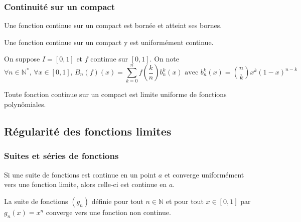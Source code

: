 	\subsubsection{Continuité sur un compact}
	
	
	\begin{proposition}
		Une fonction continue sur un compact est bornée et atteint ses bornes.
	\end{proposition}
	
	\begin{theorem}[Heine]
		Une fonction continue sur un compact y est uniformément continue.
	\end{theorem}
	
	
	\begin{theorem}[Bernstein]
		On suppose $I = [0,1]$ et $f$ continue sur $[0,1]$. On note
		\[ \forall n \in \mathbb{N}^*, \, \forall x \in [0,1], \, B_n(f)(x) = \sum_{k=0}^n f \left(\frac{k}{n}\right) b_n^k(x) \text{ avec } b_n^k(x) = \binom{n}{k} x^k (1-x)^{n-k} \]
	\end{theorem}
	
	
	\begin{theorem}[Weierstrass]
		Toute fonction continue sur un compact est limite uniforme de fonctions polynômiales.
	\end{theorem}
	
	\subsection{Régularité des fonctions limites}
	
	\subsubsection{Suites et séries de fonctions}
	
	
	\begin{proposition}
		Si une suite de fonctions est continue en un point $a$ et converge uniformément vers une fonction limite, alors celle-ci est continue en $a$.
	\end{proposition}
	
	\begin{cexample}
		La suite de fonctions $(g_n)$ définie pour tout $n \in \mathbb{N}$ et pour tout $x \in [0,1]$ par $g_n(x) = x^n$ converge vers une fonction non continue.
	\end{cexample}
	

